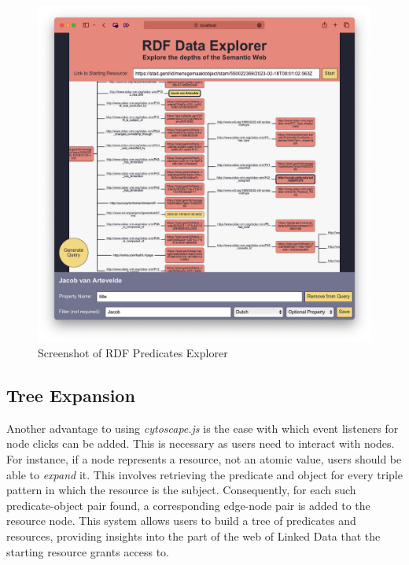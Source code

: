 \begin{figure}[htbp]
    \centering
	\includegraphics[width=\textwidth]{images/rdf_explorer.png}
	\caption{Screenshot of RDF Predicates Explorer}
	\label{fig:rdf_explorer}
\end{figure}

\subsection{Tree Expansion}

Another advantage to using \textit{cytoscape.js} is the ease with which event listeners for node clicks can be added. This is necessary as users need to interact with nodes. For instance, if a node represents a resource, not an atomic value, users should be able to \textit{expand} it. This involves retrieving the predicate and object for every triple pattern in which the resource is the subject. Consequently, for each such predicate-object pair found, a corresponding edge-node pair is added to the resource node. This system allows users to build a tree of predicates and resources, providing insights into the part of the web of Linked Data that the starting resource grants access to.

